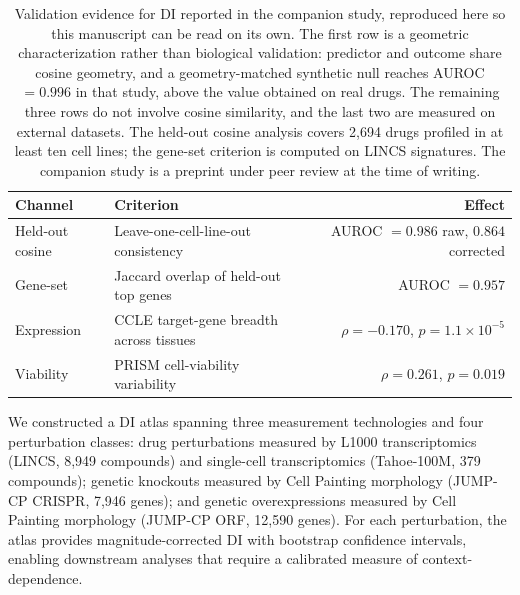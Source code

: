 \documentclass[11pt]{article}
\begin{document}
\vspace{1em}
\begin{table}[htbp]
\centering
\caption{Validation evidence for DI reported in the companion study, reproduced
here so this manuscript can be read on its own.  The first row is a geometric
characterization rather than biological validation: predictor and outcome share
cosine geometry, and a geometry-matched synthetic null reaches AUROC $= 0.996$ in
that study, above the value obtained on real drugs.  The remaining three rows do
not involve cosine similarity, and the last two are measured on external
datasets.  The held-out cosine analysis covers 2{,}694 drugs profiled in at
least ten cell lines; the gene-set criterion is computed on LINCS signatures.
The companion study is a preprint under peer review at the time of writing.}
\label{tab:companion}
\small
\begin{tabular}{@{}llr@{}}
\toprule
\textbf{Channel} & \textbf{Criterion} & \textbf{Effect} \\
\midrule
Held-out cosine & Leave-one-cell-line-out consistency & AUROC $= 0.986$ raw, $0.864$ corrected \\
Gene-set & Jaccard overlap of held-out top genes & AUROC $= 0.957$ \\
Expression & CCLE target-gene breadth across tissues & $\rho = -0.170$, $p = 1.1 \times 10^{-5}$ \\
Viability & PRISM cell-viability variability & $\rho = 0.261$, $p = 0.019$ \\
\bottomrule
\end{tabular}
\end{table}

We constructed a DI atlas spanning three measurement technologies and
four perturbation classes: drug perturbations measured by L1000
transcriptomics (LINCS, 8{,}949 compounds) and single-cell
transcriptomics (Tahoe-100M, 379 compounds); genetic knockouts measured
by Cell Painting morphology (JUMP-CP CRISPR, 7{,}946 genes); and
genetic overexpressions measured by Cell Painting morphology (JUMP-CP
ORF, 12{,}590 genes).  For each perturbation, the atlas provides
magnitude-corrected DI with bootstrap confidence intervals, enabling
downstream analyses that require a calibrated measure of
context-dependence.
\end{document}

